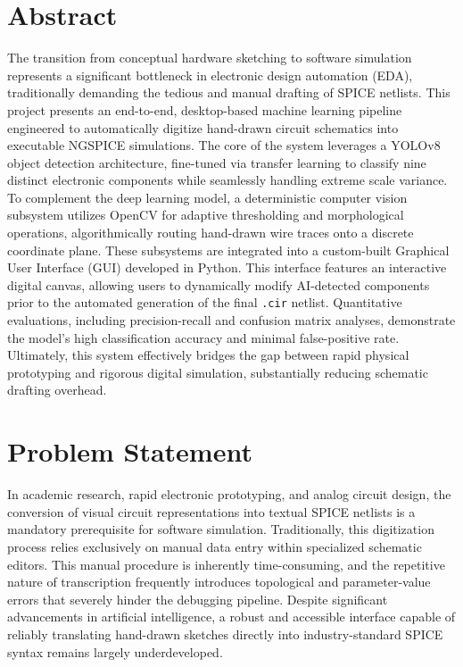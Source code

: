\documentclass[12pt]{article}
\begin{document}
\newpage
{}
\section*{Abstract}
The transition from conceptual hardware sketching to software simulation represents a significant bottleneck in electronic design automation (EDA), traditionally demanding the tedious and manual drafting of SPICE netlists. This project presents an end-to-end, desktop-based machine learning pipeline engineered to automatically digitize hand-drawn circuit schematics into executable NGSPICE simulations. The core of the system leverages a YOLOv8 object detection architecture, fine-tuned via transfer learning to classify nine distinct electronic components while seamlessly handling extreme scale variance. To complement the deep learning model, a deterministic computer vision subsystem utilizes OpenCV for adaptive thresholding and morphological operations, algorithmically routing hand-drawn wire traces onto a discrete coordinate plane. These subsystems are integrated into a custom-built Graphical User Interface (GUI) developed in Python. This interface features an interactive digital canvas, allowing users to dynamically modify AI-detected components prior to the automated generation of the final \texttt{.cir} netlist. Quantitative evaluations, including precision-recall and confusion matrix analyses, demonstrate the model's high classification accuracy and minimal false-positive rate. Ultimately, this system effectively bridges the gap between rapid physical prototyping and rigorous digital simulation, substantially reducing schematic drafting overhead.

\newpage
\section*{Problem Statement}
In academic research, rapid electronic prototyping, and analog circuit design, the conversion of visual circuit representations into textual SPICE netlists is a mandatory prerequisite for software simulation. Traditionally, this digitization process relies exclusively on manual data entry within specialized schematic editors. This manual procedure is inherently time-consuming, and the repetitive nature of transcription frequently introduces topological and parameter-value errors that severely hinder the debugging pipeline. Despite significant advancements in artificial intelligence, a robust and accessible interface capable of reliably translating hand-drawn sketches directly into industry-standard SPICE syntax remains largely underdeveloped. 
\end{document}
